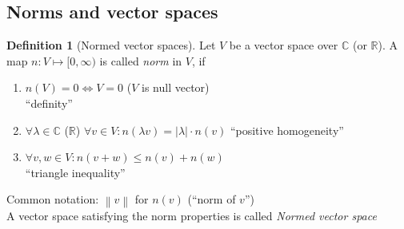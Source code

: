\documentclass[a4paper,landscape,twocolumn]{article}
\theoremstyle{definition}
\newtheorem{defi}{Definition}
\newcommand\abs[1]{\left|#1\right|}
\newcommand\norm[1]{\left\|#1\right\|}
\begin{document}
\subsection{Norms and vector spaces}
%
%
\begin{defi}[Normed vector spaces]
  Let $V$ be a vector space over $\mathbb C$ (or $\mathbb R$).
  A map $n: V \mapsto [0,\infty)$ is called \emph{norm} in $V$, if
  \begin{enumerate}
    \item $n(V) = 0 \Leftrightarrow V = 0$ ($V$ is null vector) \\
      \enquote{definity}
    \item $\forall \lambda \in \mathbb C$ ($\mathbb R$) $\forall v \in V: n(\lambda v) = \abs{\lambda} \cdot n(v)$
      \enquote{positive homogeneity}
    \item $\forall v,w \in V: n(v + w) \leq n(v) + n(w)$ \\
      \enquote{triangle inequality}
  \end{enumerate}
  Common notation: $\norm{v}$ for $n(v)$ (\enquote{norm of $v$}) \\
  A vector space satisfying the norm properties is called \emph{Normed vector space}
\end{defi}
\end{document}
